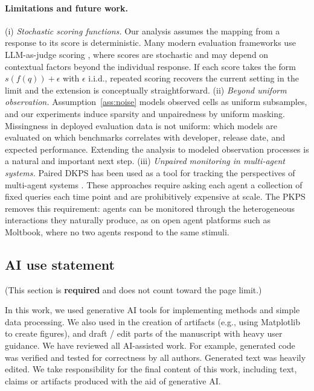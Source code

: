 \documentclass{article}
\theoremstyle{definition}
\theoremstyle{plain}
\newcommand{\PKPS}{PKPS\xspace}
\begin{document}
\paragraph{Limitations and future work.}
(i) \textit{Stochastic scoring functions.}
Our analysis assumes the mapping from a response to its score is deterministic.
Many modern evaluation frameworks use LLM-as-judge scoring \citep{zheng2023judging},
where scores are stochastic and may depend on contextual factors beyond the
individual response.
If each score takes the form $s(f(q))+\epsilon$ with $\epsilon$ i.i.d., repeated
scoring recovers the current setting in the limit and the extension is conceptually
straightforward.
(ii) \textit{Beyond uniform observation.}
Assumption~\ref{ass:noise} models observed cells as uniform subsamples, and our
experiments induce sparsity and unpairedness by uniform masking.
Missingness in deployed evaluation data is not uniform: which models are evaluated
on which benchmarks correlates with developer, release date, and expected
performance.
Extending the analysis to modeled observation processes is a natural and important next step.
(iii) \textit{Unpaired monitoring in multi-agent systems.}
Paired DKPS has been used as a tool for tracking the perspectives of multi-agent
systems \citep{helm2024tracking, bridgeford2026change, helm2026control}.
These approaches require asking each agent a collection of fixed queries each time
point and are prohibitively expensive at scale.
The \PKPS removes this requirement: agents can be monitored through the
heterogeneous interactions they naturally produce, as on open agent platforms such
as Moltbook, where no two agents respond to the same stimuli.

\clearpage

\subsection*{AI use statement}

(This section is \textbf{required} and does not count toward the page limit.)

In this work, we used generative AI tools for implementing methods and simple data processing.
We also used in the creation of artifacts (e.g., using Matplotlib to create figures), and draft / edit parts of the manuscript with heavy user guidance.
We have reviewed all AI-assisted work.
For example, generated code was verified and tested for correctness by all authors.
Generated text was heavily edited.
We take responsibility for the final content of this work,
including text, claims or artifacts produced with the aid of generative AI.
\end{document}
